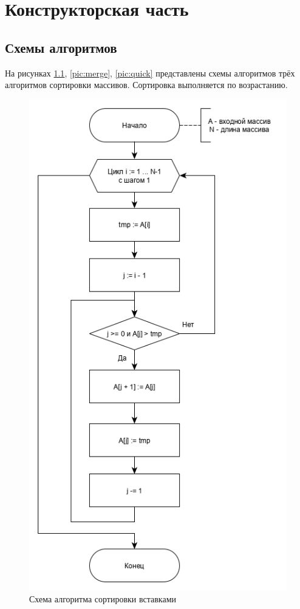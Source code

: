 \documentclass[12pt, a4paper]{report}
\begin{document}
	\chapter{Конструкторская часть}
	
	\section{Схемы алгоритмов}
	На рисунках \ref{pic:insert}, \ref{pic:merge}, \ref{pic:quick} представлены схемы алгоритмов трёх алгоритмов сортировки массивов. Сортировка выполняется по возрастанию.
	\begin{figure}[ht!]
		\centering
		\includegraphics[scale=0.55]{insert.png}
		\caption{Схема алгоритма сортировки вставками}
		\label{pic:insert}
	\end{figure}
\end{document}
